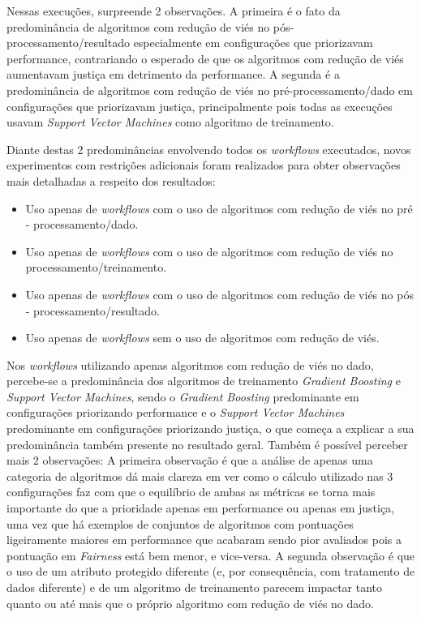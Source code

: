 \documentclass[twocolumn]{article}
\begin{document}
Nessas execuções, surpreende 2 observações. A primeira é o fato da predominância de algoritmos com redução de viés no pós-processamento/resultado especialmente em configurações que priorizavam performance, contrariando o esperado de que os algoritmos com redução de viés aumentavam justiça em detrimento da performance. A segunda é a predominância de algoritmos com redução de viés no pré-processamento/dado em configurações que priorizavam justiça, principalmente pois todas as execuções usavam \textit{Support Vector Machines} como algoritmo de treinamento.

Diante destas 2 predominâncias envolvendo todos os \textit{workflows} executados, novos experimentos com restrições adicionais foram realizados para obter observações mais detalhadas a respeito dos resultados:

\begin{itemize}
\item Uso apenas de \textit{workflows} com o uso de algoritmos com redução de viés no pré - processamento/dado.
\item Uso apenas de \textit{workflows} com o uso de algoritmos com redução de viés no processamento/treinamento.
\item Uso apenas de \textit{workflows} com o uso de algoritmos com redução de viés no pós - processamento/resultado.
\item Uso apenas de \textit{workflows} sem o uso de algoritmos com redução de viés.
\end{itemize}

Nos \textit{workflows} utilizando apenas algoritmos com redução de viés no dado, percebe-se a predominância dos algoritmos de treinamento \textit{Gradient Boosting} e \textit{Support Vector Machines}, sendo o \textit{Gradient Boosting} predominante em configurações priorizando performance e o \textit{Support Vector Machines} predominante em configurações priorizando justiça, o que começa a explicar a sua predominância também presente no resultado geral. Também é possível perceber mais 2 observações: A primeira observação é que a análise de apenas uma categoria de algoritmos dá mais clareza em ver como o cálculo utilizado nas 3 configurações faz com que o equilíbrio de ambas as métricas se torna mais importante do que a prioridade apenas em performance ou apenas em justiça, uma vez que há exemplos de conjuntos de algoritmos com pontuações ligeiramente maiores em performance que acabaram sendo pior avaliados pois a pontuação em \textit{Fairness} está bem menor, e vice-versa. A segunda observação é que o uso de um atributo protegido diferente (e, por consequência, com tratamento de dados diferente) e de um algoritmo de treinamento parecem impactar tanto quanto ou até mais que o próprio algoritmo com redução de viés no dado.
\end{document}
